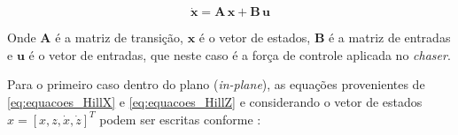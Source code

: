 \begin{equation}
    \dot{\mathbf{x}} = \mathbf{A}\,\mathbf{x} + \mathbf{B}\,\mathbf{u}
    \label{eq:state_space_general}
\end{equation}

Onde $\mathbf{A}$ é a matriz de transição, $\mathbf{x}$ é o vetor de estados, $\mathbf{B}$ é a matriz de entradas e $\mathbf{u}$ é o vetor de entradas, que neste caso é a força de controle aplicada no \emph{chaser}.

Para o primeiro caso dentro do plano (\textit{in-plane}), as equações provenientes de \eqref{eq:equacoes_HillX} e \eqref{eq:equacoes_HillZ} e considerando o vetor de estados $x = [x,z, \dot{x}, \dot{z}]^T$ podem ser escritas conforme \cite{fehse2003}:


